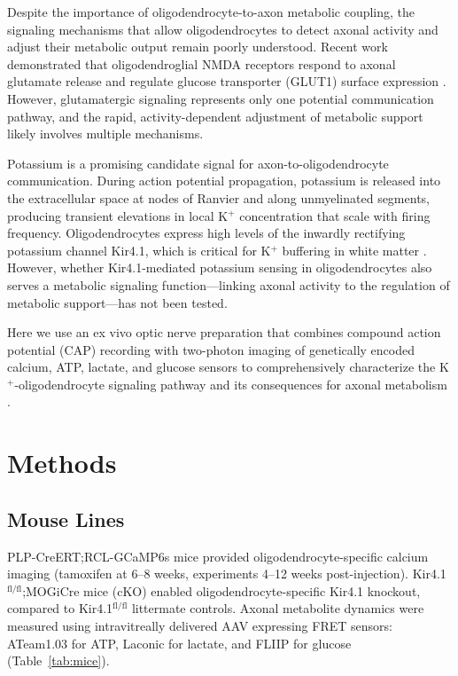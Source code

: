 \documentclass[12pt]{article}
\begin{document}
Despite the importance of oligodendrocyte-to-axon metabolic coupling, the signaling mechanisms that allow oligodendrocytes to detect axonal activity and adjust their metabolic output remain poorly understood. Recent work demonstrated that oligodendroglial NMDA receptors respond to axonal glutamate release and regulate glucose transporter (GLUT1) surface expression \citep{saab2016oligodendroglial}. However, glutamatergic signaling represents only one potential communication pathway, and the rapid, activity-dependent adjustment of metabolic support likely involves multiple mechanisms.

Potassium is a promising candidate signal for axon-to-oligodendrocyte communication. During action potential propagation, potassium is released into the extracellular space at nodes of Ranvier and along unmyelinated segments, producing transient elevations in local K$^+$ concentration that scale with firing frequency. Oligodendrocytes express high levels of the inwardly rectifying potassium channel Kir4.1, which is critical for K$^+$ buffering in white matter \citep{neusch2001kir41, larson2018oligodendrocytes}. However, whether Kir4.1-mediated potassium sensing in oligodendrocytes also serves a metabolic signaling function---linking axonal activity to the regulation of metabolic support---has not been tested.

Here we use an ex vivo optic nerve preparation that combines compound action potential (CAP) recording with two-photon imaging of genetically encoded calcium, ATP, lactate, and glucose sensors to comprehensively characterize the K$^+$-oligodendrocyte signaling pathway and its consequences for axonal metabolism \citep{imamura2009visualization, san2013imaging}.

\section{Methods}

\subsection{Mouse Lines}

PLP-CreERT;RCL-GCaMP6s mice provided oligodendrocyte-specific calcium imaging (tamoxifen at 6--8 weeks, experiments 4--12 weeks post-injection). Kir4.1$^{\text{fl/fl}}$;MOGiCre mice (cKO) enabled oligodendrocyte-specific Kir4.1 knockout, compared to Kir4.1$^{\text{fl/fl}}$ littermate controls. Axonal metabolite dynamics were measured using intravitreally delivered AAV expressing FRET sensors: ATeam1.03 for ATP, Laconic for lactate, and FLIIP for glucose (Table~\ref{tab:mice}).
\end{document}
